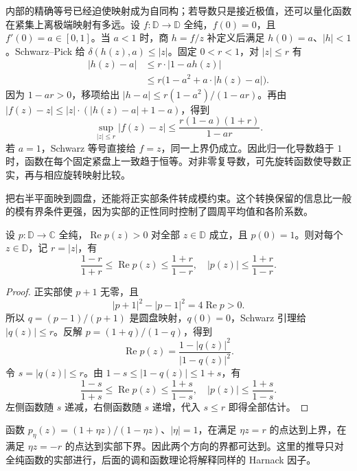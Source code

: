 内部的精确等号已经迫使映射成为自同构；若导数只是接近极值，还可以量化函数在紧集上离极端映射有多远。设 \(f:\mathbb D\rightarrow\mathbb D\) 全纯，\(f(0)=0\)，且 \(f'(0)=a\in[0,1]\)。当 \(a<1\) 时，商 \(h=f/z\) 补定义后满足 \(h(0)=a\)、\(|h|<1\)。Schwarz--Pick 给 \(\delta(h(z),a)\le|z|\)。固定 \(0<r<1\)，对 \(|z|\le r\) 有
\[
 \begin{aligned}
 |h(z)-a|&\le r\cdot|1-ah(z)|\\
 &\le r\bigl(1-a^2+a\cdot|h(z)-a|\bigr).
 \end{aligned}
\]
因为 \(1-ar>0\)，移项给出 \(|h-a|\le r(1-a^2)/(1-ar)\)。再由 \(|f(z)-z|\le|z|\cdot(|h(z)-a|+1-a)\)，得到
\[
 \sup_{|z|\le r}|f(z)-z|
 \le\frac{r(1-a)(1+r)}{1-ar}.
\]
若 \(a=1\)，Schwarz 等号直接给 \(f=z\)，同一上界仍成立。因此归一化导数趋于 \(1\) 时，函数在每个固定紧盘上一致趋于恒等。对非零复导数，可先旋转函数使导数正实，再与相应旋转映射比较。

\ProseParagraphBreak

把右半平面映到圆盘，还能将正实部条件转成模约束。这个转换保留的信息比一般的模有界条件更强，因为实部的正性同时控制了圆周平均值和各阶系数。

\begin{proposition}[正实部函数的增长估计]\label{b3:prop:06-positive-real-part}
设 \(p:\mathbb D\rightarrow\mathbb C\) 全纯，\(\operatorname{Re}p(z)>0\) 对全部 \(z\in\mathbb D\) 成立，且 \(p(0)=1\)。则对每个 \(z\in\mathbb D\)，记 \(r=|z|\)，有
\[
 \frac{1-r}{1+r}\le\operatorname{Re}p(z)
 \le\frac{1+r}{1-r},
 \quad |p(z)|\le\frac{1+r}{1-r}.
\]
\end{proposition}
\begin{proof}
正实部使 \(p+1\) 无零，且
\[
 |p+1|^2-|p-1|^2=4\operatorname{Re}p>0.
\]
所以 \(q=(p-1)/(p+1)\) 是圆盘映射，\(q(0)=0\)，Schwarz 引理给 \(|q(z)|\le r\)。反解 \(p=(1+q)/(1-q)\)，得到
\[
 \operatorname{Re}p(z)=\frac{1-|q(z)|^2}{|1-q(z)|^2}.
\]
令 \(s=|q(z)|\le r\)。由 \(1-s\le|1-q(z)|\le1+s\)，有
\[
 \frac{1-s}{1+s}\le\operatorname{Re}p(z)\le\frac{1+s}{1-s},
 \quad |p(z)|\le\frac{1+s}{1-s}.
\]
左侧函数随 \(s\) 递减，右侧函数随 \(s\) 递增，代入 \(s\le r\) 即得全部估计。
\end{proof}

函数 \(p_\eta(z)=(1+\eta z)/(1-\eta z)\)、\(|\eta|=1\)，在满足 \(\eta z=r\) 的点达到上界，在满足 \(\eta z=-r\) 的点达到实部下界。因此两个方向的界都可达到。这里的推导只对全纯函数的实部进行，后面的调和函数理论将解释同样的 Harnack 因子。

\ProseParagraphBreak

